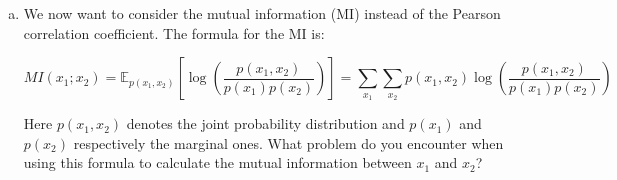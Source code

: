 {\begin{enumerate}[a)]
\begin{center}
\texttt{[image: figure/add\_Points\_x1\_x2.pdf]}
\end{center}

Based on your drawing, do you consider the Pearson correlation coefficient a reliable measure to 
detect dependencies for the above use case?


%
% 
%

\dlz

\item\label{MI_Aufgabe} We now want to consider the mutual information (MI) instead of the Pearson correlation coefficient.
The formula for the MI is:

\[
  	MI(x_1 ; x_2 ) =  \mathbb{E}_{p(x_1, x_2)} \left[ \log\left(\frac{p(x_1, x_2)}{p(x_1) p(x_2)} \right) \right] = \sum_{x_1} \sum_{x_2} p(x_1, x_2) \log\left(\frac{p(x_1, x_2)}{p(x_1) p(x_2)} \right) 
\]

Here \(p(x_1, x_2)\) denotes the joint probability distribution and \(p(x_1)\) and \(p(x_2)\) respectively the marginal ones.
What problem do you encounter when using this formula to calculate the mutual information between $x_1$ and $x_2$? 

\end{enumerate}
}

\dlz

